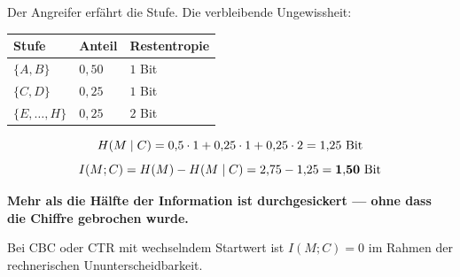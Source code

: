 \begin{aufgabe}
Der Angreifer erfährt die Stufe. Die verbleibende Ungewissheit:
\begin{center}
\renewcommand{\arraystretch}{1.46}
\begin{tabular}{@{}P{2.2cm}P{2.2cm}P{2.6cm}@{}}
\toprule
\textbf{Stufe} & \textbf{Anteil} & \textbf{Restentropie}\\
\midrule
$\{A,B\}$ & $0{,}50$ & $1$ Bit\\
$\{C,D\}$ & $0{,}25$ & $1$ Bit\\
$\{E,\ldots,H\}$ & $0{,}25$ & $2$ Bit\\
\bottomrule
\end{tabular}
\end{center}

\[ H(M\mid C) = 0{,}5\cdot1 + 0{,}25\cdot1 + 0{,}25\cdot2 = 1{,}25 \ \text{Bit} \]
\[ I(M;C) = H(M) - H(M\mid C) = 2{,}75 - 1{,}25 = \mathbf{1{,}50} \ \text{Bit} \]

\begin{center}
\begin{minipage}{0.9\textwidth}
\textbf{Mehr als die Hälfte der Information ist durchgesickert --- ohne dass die Chiffre gebrochen wurde.}
\end{minipage}
\end{center}

Bei CBC oder CTR mit wechselndem Startwert ist $I(M;C) = 0$ im Rahmen der rechnerischen Ununterscheidbarkeit.

\begin{center}
\begin{minipage}{0.88\textwidth}
\end{minipage}
\end{center}
\end{aufgabe}

